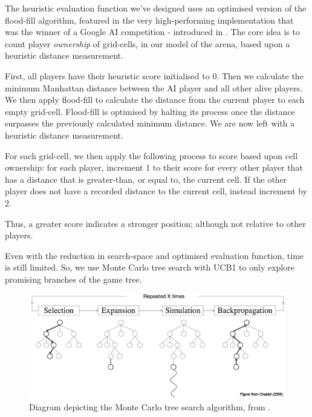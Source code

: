 \documentclass{standalone}
\begin{document}
		The heuristic evaluation function we've designed uses an optimised version of the flood-fill algorithm, featured in the very high-performing implementation that was the winner of a Google AI competition - introduced in . The core idea is to count player \emph{ownership} of grid-cells, in our model of the arena, based upon a heuristic distance measurement.

		First, all players have their heuristic score initialised to 0. Then we calculate the minimum Manhattan distance between the AI player and all other alive players. We then apply flood-fill to calculate the distance from the current player to each empty grid-cell. Flood-fill is optimised by halting its process once the distance surpasses the previously calculated minimum distance. We are now left with a heuristic distance measurement.

		For each grid-cell, we then apply the following process to score based upon cell ownership: for each player, increment 1 to their score for every other player that has a distance that is greater-than, or equal to, the current cell. If the other player does not have a recorded distance to the current cell, instead increment by 2.

		Thus, a greater score indicates a stronger position; although not relative to other players.

		Even with the reduction in search-space and optimised evaluation function, time is still limited. So, we use Monte Carlo tree search \parencite{MonteCarloTreeSearch} with UCB1 to only explore promising branches of the game tree. 
		\begin{figure}[!htbp]
			\centering
			\includegraphics[width=.8\textwidth]{resources/images/mcts.png}
			\caption{Diagram depicting the Monte Carlo tree search algorithm, from \parencite{MonteCarloTreeSearchDiagram}.}
		\end{figure}
\end{document}
